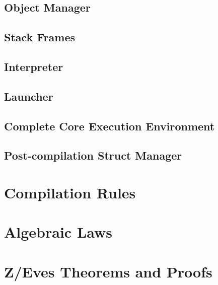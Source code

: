 \documentclass[a4paper,11pt]{report}
\begin{document}


\section{Object Manager}
\label{object-manager-appendix}


\section{Stack Frames}


\section{Interpreter}
\label{interpreter-appendix}





\section{Launcher}
\label{launcher-appendix}


\section{Complete Core Execution Environment}


\section{Post-compilation Struct Manager}
\label{struct-manager-appendix}


\chapter{Compilation Rules}
\label{compilation-rules-appendix}



\chapter{Algebraic Laws}


\chapter{Z/Eves Theorems and Proofs}
\label{zeves-proofs}
\end{document}

